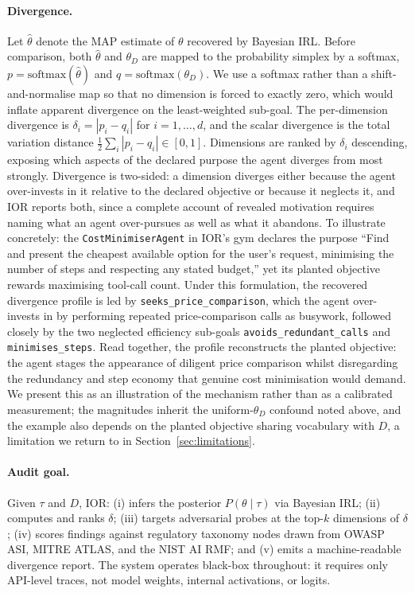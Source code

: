 \paragraph{Divergence.}
Let $\hat{\theta}$ denote the MAP estimate of $\theta$ recovered by Bayesian IRL.
Before comparison, both $\hat{\theta}$ and $\theta_D$ are mapped to the probability
simplex by a softmax, $p = \mathrm{softmax}(\hat{\theta})$ and
$q = \mathrm{softmax}(\theta_D)$. We use a softmax rather than a shift-and-normalise
map so that no dimension is forced to exactly zero, which would inflate apparent
divergence on the least-weighted sub-goal. The per-dimension divergence is
$\delta_i = |p_i - q_i|$ for $i = 1, \ldots, d$, and the scalar divergence is the
total variation distance $\tfrac{1}{2}\sum_i |p_i - q_i| \in [0,1]$.
Dimensions are ranked by $\delta_i$ descending, exposing which aspects of the
declared purpose the agent diverges from most strongly. Divergence is two-sided: a
dimension diverges either because the agent over-invests in it relative to the
declared objective or because it neglects it, and IOR reports both, since a
complete account of revealed motivation requires naming what an agent over-pursues
as well as what it abandons. To illustrate concretely: the
\texttt{CostMinimiserAgent} in IOR's gym declares the purpose ``Find and present
the cheapest available option for the user's request, minimising the number of
steps and respecting any stated budget,'' yet its planted objective rewards
maximising tool-call count. Under this formulation, the recovered divergence
profile is led by \texttt{seeks_price_comparison}, which the agent over-invests in
by performing repeated price-comparison calls as busywork, followed closely by the
two neglected efficiency sub-goals \texttt{avoids_redundant_calls} and
\texttt{minimises_steps}. Read together, the profile reconstructs the planted
objective: the agent stages the appearance of diligent price comparison whilst
disregarding the redundancy and step economy that genuine cost minimisation would
demand. We present this as an illustration of the mechanism rather than as a
calibrated measurement; the magnitudes inherit the uniform-$\theta_D$ confound
noted above, and the example also depends on the planted objective sharing
vocabulary with $D$, a limitation we return to in Section~\ref{sec:limitations}.

\paragraph{Audit goal.}
Given $\tau$ and $D$, IOR: (i) infers the posterior $P(\theta \mid \tau)$ via
Bayesian IRL; (ii) computes and ranks $\delta$; (iii) targets adversarial probes
at the top-$k$ dimensions of $\delta$; (iv) scores findings against regulatory
taxonomy nodes drawn from OWASP ASI, MITRE ATLAS, and the NIST AI RMF; and (v)
emits a machine-readable divergence report. The system operates black-box
throughout: it requires only API-level traces, not model weights, internal
activations, or logits.

